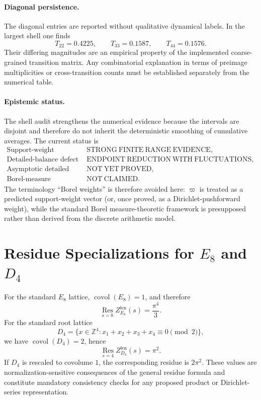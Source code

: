\documentclass{article}
\begin{document}
\paragraph{Diagonal persistence.}
The diagonal entries are reported without qualitative dynamical labels.  In the largest
shell one finds
\[
T_{22}=0.4225,\qquad T_{33}=0.1587,\qquad T_{44}=0.1576.
\]
Their differing magnitudes are an empirical property of the implemented coarse-grained
transition matrix.  Any combinatorial explanation in terms of preimage multiplicities or
cross-transition counts must be established separately from the numerical table.

\paragraph{Epistemic status.}
The shell audit strengthens the numerical evidence because the intervals are disjoint and
therefore do not inherit the deterministic smoothing of cumulative averages.  The current
status is
\[
\boxed{
\begin{array}{ll}
\text{Support-weight convergence} & \mathrm{STRONG\ FINITE\ RANGE\ EVIDENCE},\\
\text{Detailed-balance defect} & \mathrm{ENDPOINT\ REDUCTION\ WITH\ FLUCTUATIONS},\\
\text{Asymptotic detailed balance} & \mathrm{NOT\ YET\ PROVED},\\
\text{Borel-measure generation} & \mathrm{NOT\ CLAIMED}.
\end{array}}
\]
The terminology ``Borel weights'' is therefore avoided here: \(\varpi\) is treated as a
predicted support-weight vector (or, once proved, as a Dirichlet-pushforward weight),
while the standard Borel measure-theoretic framework is presupposed rather than derived
from the discrete arithmetic model.


\section{Residue Specializations for $E_8$ and $D_4$}

For the standard $E_8$ lattice, $\operatorname{covol}(E_8)=1$, and therefore
\[
\boxed{\operatorname*{Res}_{s=8}Z_{E_8}^{\mathrm{len}}(s)=\frac{\pi^4}{3}.}
\]
For the standard root lattice
\[
D_4=\{x\in\mathbb Z^4: x_1+x_2+x_3+x_4\equiv0\pmod2\},
\]
we have $\operatorname{covol}(D_4)=2$, hence
\[
\boxed{\operatorname*{Res}_{s=4}Z_{D_4}^{\mathrm{len}}(s)=\pi^2.}
\]
If $D_4$ is rescaled to covolume $1$, the corresponding residue is $2\pi^2$.
These values are normalization-sensitive consequences of the general residue formula and constitute mandatory consistency checks for any proposed product or Dirichlet-series representation.
\end{document}
